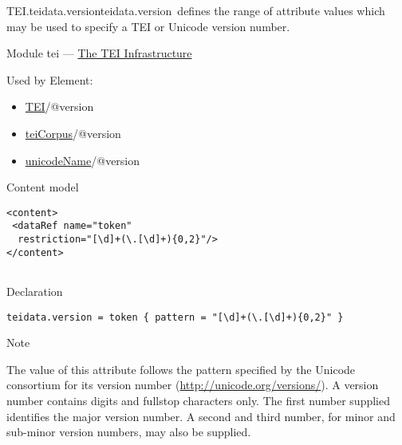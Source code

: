 \begin{reflist}
\item[]\begin{specHead}{TEI.teidata.version}{teidata.version} defines the range of attribute values which may be used to specify a TEI or Unicode version number.\end{specHead} 
    \item[{Module}]
  tei — \hyperref[ST]{The TEI Infrastructure}
    \item[{Used by}]
  Element: \begin{itemize}
\item \hyperref[TEI.TEI]{TEI}/@version
\item \hyperref[TEI.teiCorpus]{teiCorpus}/@version
\item \hyperref[TEI.unicodeName]{unicodeName}/@version
\end{itemize} 
    \item[{Content model}]
  \mbox{}\hfill\\[-10pt]\begin{Verbatim}[fontsize=\small]
<content>
 <dataRef name="token"
  restriction="[\d]+(\.[\d]+){0,2}"/>
</content>
    
\end{Verbatim}

    \item[{Declaration}]
  \mbox{}\hfill\\[-10pt]\begin{Verbatim}[fontsize=\small]
teidata.version = token { pattern = "[\d]+(\.[\d]+){0,2}" }
\end{Verbatim}

    \item[{Note}]
  \par
The value of this attribute follows the pattern specified by the Unicode consortium for its version number (\url{http://unicode.org/versions/}). A version number contains digits and fullstop characters only. The first number supplied identifies the major version number. A second and third number, for minor and sub-minor version numbers, may also be supplied.
\end{reflist}  
